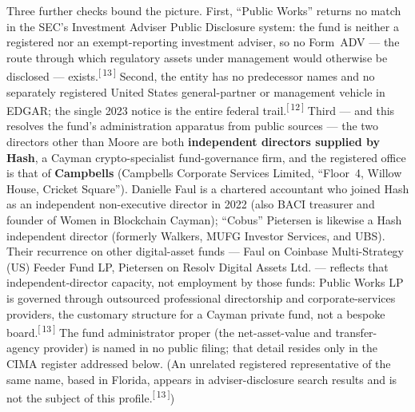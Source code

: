\documentclass[11pt,letterpaper]{article}
\newcommand{\refn}[1]{\textsuperscript{[\,#1\,]}}
\begin{document}
Three further checks bound the picture. First, ``Public Works'' returns no
match in the SEC's Investment Adviser Public Disclosure system: the fund is
neither a registered nor an exempt-reporting investment adviser, so no
Form~ADV --- the route through which regulatory assets under management would
otherwise be disclosed --- exists.\refn{13} Second, the entity has no
predecessor names and no separately registered United States general-partner
or management vehicle in EDGAR; the single 2023 notice is the entire federal
trail.\refn{12} Third --- and this resolves the fund's administration
apparatus from public sources --- the two directors other than Moore are both
\textbf{independent directors supplied by Hash}, a Cayman crypto-specialist
fund-governance firm, and the registered office is that of \textbf{Campbells}
(Campbells Corporate Services Limited, ``Floor~4, Willow House, Cricket
Square''). Danielle Faul is a chartered accountant who joined Hash as an
independent non-executive director in 2022 (also BACI treasurer and founder
of Women in Blockchain Cayman); ``Cobus'' Pietersen is likewise a Hash
independent director (formerly Walkers, MUFG Investor Services, and UBS).
Their recurrence on other digital-asset funds --- Faul on Coinbase
Multi-Strategy (US) Feeder Fund LP, Pietersen on Resolv Digital Assets Ltd.
--- reflects that independent-director capacity, not employment by those
funds: Public Works LP is governed through outsourced professional
directorship and corporate-services providers, the customary structure for a
Cayman private fund, not a bespoke board.\refn{13} The fund administrator
proper (the net-asset-value and transfer-agency provider) is named in no
public filing; that detail resides only in the CIMA register addressed below.
(An unrelated registered representative of the same name, based in Florida,
appears in adviser-disclosure search results and is not the subject of this
profile.\refn{13})
\end{document}
